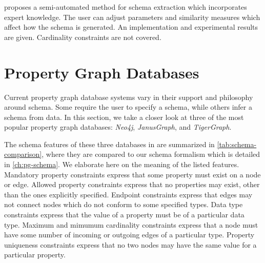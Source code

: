 \documentclass{report}
\theoremstyle{definition}
\begin{document}
\citet{lei2021thesis} proposes a semi-automated method for schema extraction which incorporates expert knowledge. The user can adjust parameters and similarity measures which affect how the schema is generated. An implementation and experimental results are given. Cardinality constraints are not covered.


\section{Property Graph Databases}

Current property graph database systems vary in their support and philosophy around schema. Some require the user to specify a schema, while others infer a schema from data. In this section, we take a closer look at three of the most popular property graph databases: \emph{Neo4j}, \emph{JanusGraph}, and \emph{TigerGraph}.

The schema features of these three databases in are summarized in \autoref{tab:schema-comparison}, where they are compared to our schema formalism which is detailed in \autoref{ch:pg-schema}. We elaborate here on the meaning of the listed features. Mandatory property constraints express that some property must exist on a node or edge. Allowed property constraints express that no properties may exist, other than the ones explicitly specified. Endpoint constraints express that edges may not connect nodes which do not conform to some specified types. Data type constraints express that the value of a property must be of a particular data type. Maximum and mimumum cardinality constraints express that a node must have some number of incoming or outgoing edges of a particular type. Property uniqueness constraints express that no two nodes may have the same value for a particular property.
\end{document}
